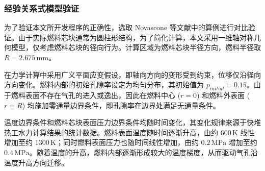 \subsubsection{经验关系式模型验证}

为了验证本文所开发程序的正确性，选取 Novascone 等文献\cite{novasconeModelingPorosityMigration2018}中的算例进行对比验证。由于实际燃料芯块通常为圆柱形结构，为了简化计算，本文采用一维轴对称几何模型，仅考虑燃料芯块的径向行为。计算区域为燃料芯块半径方向，燃料半径取 $R=2.675\,\mathrm{mm}$。

在力学计算中采用广义平面应变假设，即轴向方向的变形受到约束，位移仅沿径向方向变化。燃料内部的初始孔隙率设定为均匀分布，其初始值为 $p_{initial}=0.15$。由于燃料表面不存在气孔的进入或逸出，因此在燃料中心 ($r=0$) 和燃料外表面 ($r=R$) 均施加零通量边界条件，即孔隙率在边界处满足无通量条件。

温度边界条件和燃料芯块表面压力边界条件均随时间变化，其变化规律来源于快堆热工水力计算结果的统计数据。燃料表面温度随时间逐渐升高，由约 $600\,\mathrm{K}$ 线性增加至约 $1300\,\mathrm{K}$；同时燃料表面压力也随时间线性增加，由约 $0.2\,\mathrm{MPa}$ 增加至约 $0.4\,\mathrm{MPa}$。随着温度的升高，燃料内部逐渐形成较大的温度梯度，从而驱动气孔沿温度升高方向迁移。

